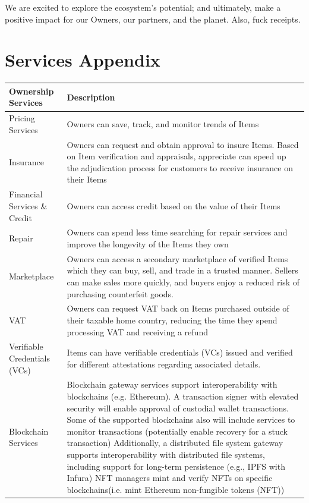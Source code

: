 \documentclass[a4paper,onecolumn, 10.5pt]{article}
\begin{document}
We are excited to explore the ecosystem’s potential; and ultimately, make a positive impact for our Owners, our partners, and the planet.  Also, fuck receipts.



\newpage
\appendix
\section{Services Appendix} \label{app: name}
	\begin{tabular}{|p{}|p{}|}
	\hline
	\textbf{Ownership Services} & \textbf{Description}\\
	\hline
	Pricing Services   & Owners can save, track, and monitor trends of Items  \\
	\hline
	Insurance & Owners can request and obtain approval to insure Items.  
		Based on Item verification and appraisals, appreciate can speed up the adjudication process for customers to receive insurance on their Items\\
		\hline
		Financial Services \& Credit & Owners can access credit based on the value of their Items \\
		\hline
		Repair & Owners can spend less time searching for repair services and improve the longevity of the Items they own \\
		\hline
		Marketplace &
		Owners can access a secondary marketplace of verified Items which they can buy, sell, and trade in a trusted manner. Sellers can make sales more quickly, and buyers enjoy a reduced risk of purchasing counterfeit goods. \\
		\hline
		VAT & Owners can request VAT back on Items purchased outside of their taxable home country, reducing the time they spend processing VAT and receiving a refund \\
		\hline
		Verifiable Credentials (VCs) &
		Items can have verifiable credentials (VCs) issued and verified for different attestations regarding associated details.  \\
		\hline
		Blockchain Services &
		Blockchain gateway services support interoperability with blockchains (e.g. Ethereum).
		A transaction signer with elevated security will enable approval of custodial wallet transactions.
		Some of the supported blockchains also will include services to monitor transactions (potentially enable recovery for a stuck transaction)
		Additionally, a distributed file system gateway supports interoperability with distributed file systems, including support for long-term persistence (e.g., IPFS with Infura)
		NFT managers mint and verify NFTs on specific blockchains(i.e. mint Ethereum non-fungible tokens (NFT)\cite{eth1155})\\
		\hline
\end{tabular}
\end{document}
